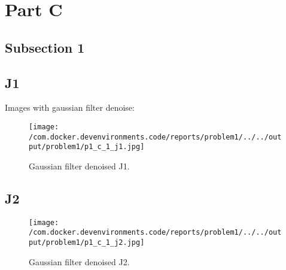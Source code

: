 \documentclass{article}%
\begin{document}
%
\section{Part C}%
\label{sec:PartC}%
\subsection{Subsection 1}%
\label{subsec:Subsection1}%
\subsection{J1}%
\label{subsec:J1}%
Images with gaussian filter denoise:%


\begin{figure}[h!]%
\centering%
\texttt{[image: /com.docker.devenvironments.code/reports/problem1/../../output/problem1/p1\_c\_1\_j1.jpg]}%
\caption{Gaussian filter denoised J1.}%
\end{figure}

%
\subsection{J2}%
\label{subsec:J2}%


\begin{figure}[h!]%
\centering%
\texttt{[image: /com.docker.devenvironments.code/reports/problem1/../../output/problem1/p1\_c\_1\_j2.jpg]}%
\caption{Gaussian filter denoised J2.}%
\end{figure}

%
\end{document}
